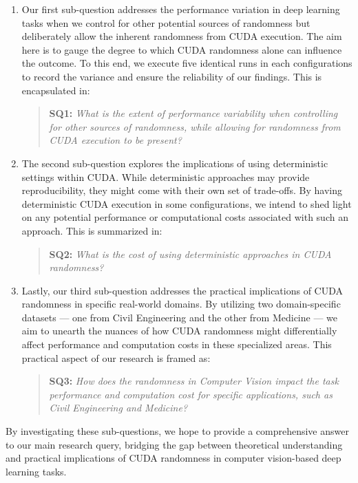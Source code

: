 \begin{enumerate}
    \item Our first sub-question addresses the performance variation in deep learning tasks when we control for other potential sources of randomness but deliberately allow the inherent randomness from CUDA execution. The aim here is to gauge the degree to which CUDA randomness alone can influence the outcome. To this end, we execute five identical runs in each configurations to record the variance and ensure the reliability of our findings. This is encapsulated in:
    \begin{quote}
    \textbf{SQ1:} \textit{What is the extent of performance variability when controlling for other sources of randomness, while allowing for randomness from CUDA execution to be present?}
    \end{quote}

    \item The second sub-question explores the implications of using deterministic settings within CUDA. While deterministic approaches may provide reproducibility, they might come with their own set of trade-offs. By having deterministic CUDA execution in some configurations, we intend to shed light on any potential performance or computational costs associated with such an approach. This is summarized in:
    \begin{quote}
    \textbf{SQ2:} \textit{What is the cost of using deterministic approaches in CUDA randomness?}
    \end{quote}

    \item Lastly, our third sub-question addresses the practical implications of CUDA randomness in specific real-world domains. By utilizing two domain-specific datasets — one from Civil Engineering and the other from Medicine — we aim to unearth the nuances of how CUDA randomness might differentially affect performance and computation costs in these specialized areas. This practical aspect of our research is framed as:
    \begin{quote}
    \textbf{SQ3:} \textit{How does the randomness in Computer Vision impact the task performance and computation cost for specific applications, such as Civil Engineering and Medicine?}
    \end{quote}
\end{enumerate}

By investigating these sub-questions, we hope to provide a comprehensive answer to our main research query, bridging the gap between theoretical understanding and practical implications of CUDA randomness in computer vision-based deep learning tasks.\\

